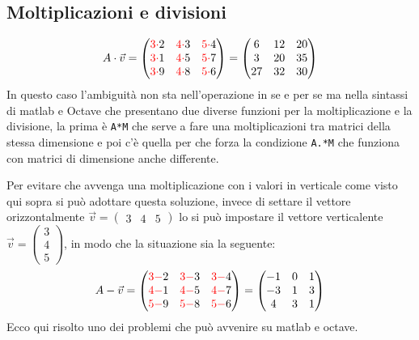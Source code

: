 \subsection{Moltiplicazioni e divisioni}
\label{sec:moltedivvetmtx}
\begin{eqnarray*}
   A\cdot\vec{v} =
  \begin{pmatrix}
    {\color{red}3\cdot}2 & {\color{red}4\cdot}3 & {\color{red}5\cdot}4\\
    {\color{red}3\cdot}1 & {\color{red}4\cdot}5 & {\color{red}5\cdot}7\\
    {\color{red}3\cdot}9 & {\color{red}4\cdot}8 & {\color{red}5\cdot}6        
  \end{pmatrix}=
  \begin{pmatrix}
    6 & 12 & 20\\
    3 & 20 & 35\\
    27 & 32 & 30
  \end{pmatrix}
\end{eqnarray*}
In questo caso l'ambiguità non sta nell'operazione in se e per se ma nella sintassi di
matlab e Octave che presentano due diverse funzioni per la moltiplicazione e la
divisione, la prima è \lstinline|A*M| che serve a fare una moltiplicazioni tra matrici
della stessa dimensione e poi c'è quella per che forza la condizione \lstinline|A.*M|
che funziona con matrici di dimensione anche differente.
\begin{oss}
  Per evitare che avvenga una moltiplicazione con i valori in verticale come
  visto qui sopra si può adottare questa soluzione, invece di settare il vettore
  orizzontalmente $\vec{v}=
                  \begin{pmatrix}
                    3 & 4 & 5
                  \end{pmatrix}$ lo si può impostare il vettore verticalente
                  $\vec{v}=
                  \begin{pmatrix}
                    3 \\ 4 \\ 5
                  \end{pmatrix}$, in modo che la situazione sia la seguente:
  \begin{equation*}
    A-\vec{v} =
    \begin{pmatrix}
        {\color{red}3-}2 & {\color{red}3-}3 & {\color{red}3-}4\\
        {\color{red}4-}1 & {\color{red}4-}5 & {\color{red}4-}7\\
        {\color{red}5-}9 & {\color{red}5-}8 & {\color{red}5-}6        
    \end{pmatrix}=
    \begin{pmatrix}
      -1 &  0 &  1\\
      -3 &  1 &  3\\
       4 &  3 &  1
    \end{pmatrix}
  \end{equation*}
  Ecco qui risolto uno dei problemi che può avvenire su matlab e octave.
\end{oss}
